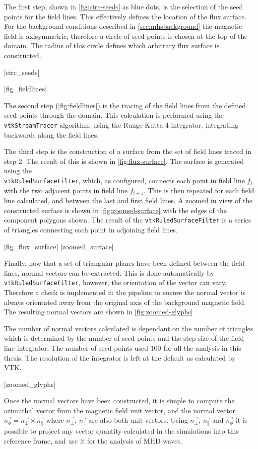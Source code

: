The first step, shown in \cref{fig:circ-seeds} as blue dots, is the selection of the seed points for the field lines.
This effectively defines the location of the flux surface.
For the background conditions described in \cref{sec:mhsbackground} the magnetic field is axisymmetric, therefore a circle of seed points is chosen at the top of the domain.
The radius of this circle defines which arbitrary flux surface is constructed.

\py[chapter3a]|circ_seeds|

\py[chapter3a]|fig_fieldlines|

The second step (\cref{fig:fieldlines}) is the tracing of the field lines from the defined seed points through the domain.
This calculation is performed using the \verb|vtkStreamTracer| algorithm, using the Runge Kutta 4 integrator, integrating backwards along the field lines.


The third step is the construction of a surface from the set of field lines traced in step 2.
The result of this is shown in \cref{fig:flux-surface}.
The surface is generated using the \\ \verb|vtkRuledSurfaceFilter|, which, as configured, connects each point in field line $f_i$ with the two adjacent points in field line $f_{i+1}$.
This is then repeated for each field line calculated, and between the last and first field lines.
A zoomed in view of the constructed surface is shown in \cref{fig:zoomed-surface} with the edges of the component polygons shown.
The result of the \verb|vtkRuledSurfaceFilter| is a series of triangles connecting each point in adjoining field lines.


\py[chapter3a]|fig_flux_surface|
\py[chapter3a]|zoomed_surface|

Finally, now that a set of triangular planes have been defined between the field lines, normal vectors can be extracted.
This is done automatically by \verb|vtkRuledSurfaceFilter|, however, the orientation of the vector can vary.
Therefore a check is implemented in the pipeline to ensure the normal vector is always orientated away from the original axis of the background magnetic field.
The resulting normal vectors are shown in \cref{fig:zoomed-glyphs}

The number of normal vectors calculated is dependant on the number of triangles which is determined by the number of seed points and the step size of the field line integrator.
The number of seed points used $100$ for all the analysis in this thesis.
The resolution of the integrator is left at the default as calculated by VTK.

\py[chapter3a]|zoomed_glyphs|

Once the normal vectors have been constructed, it is simple to compute the azimuthal vector from the magnetic field unit vector, and the normal vector $\vec{n_\phi}= \vec{n_\perp} \times \vec{n_\parallel}$ where $\vec{n_\perp},\ \vec{n_\parallel} $ are also both unit vectors. 
Using  $\vec{n_\perp},\ \vec{n_\parallel}$ and $\vec{n_\phi}$ it  is possible to project any vector quantity calculated in the simulations into this reference frame, and use it for the analysis of MHD waves.


